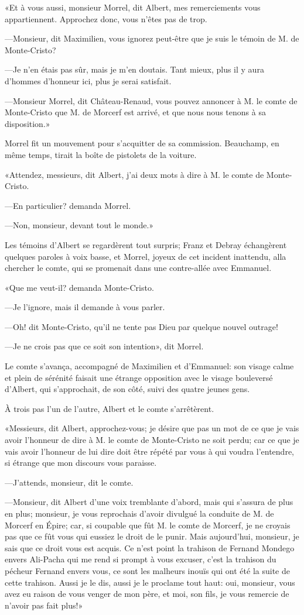 «Et à vous aussi, monsieur Morrel, dit Albert, mes remerciements vous appartiennent. Approchez donc, vous n'êtes pas de trop. 

—Monsieur, dit Maximilien, vous ignorez peut-être que je suis le témoin de M. de Monte-Cristo? 

—Je n'en étais pas sûr, mais je m'en doutais. Tant mieux, plus il y aura d'hommes d'honneur ici, plus je serai satisfait. 

—Monsieur Morrel, dit Château-Renaud, vous pouvez annoncer à M. le comte de Monte-Cristo que M. de Morcerf est arrivé, et que nous nous tenons à sa disposition.» 

Morrel fit un mouvement pour s'acquitter de sa commission. Beauchamp, en même temps, tirait la boîte de pistolets de la voiture. 

«Attendez, messieurs, dit Albert, j'ai deux mots à dire à M. le comte de Monte-Cristo. 

—En particulier? demanda Morrel. 

—Non, monsieur, devant tout le monde.» 

Les témoins d'Albert se regardèrent tout surpris; Franz et Debray échangèrent quelques paroles à voix basse, et Morrel, joyeux de cet incident inattendu, alla chercher le comte, qui se promenait dans une contre-allée avec Emmanuel. 

«Que me veut-il? demanda Monte-Cristo. 

—Je l'ignore, mais il demande à vous parler. 

—Oh! dit Monte-Cristo, qu'il ne tente pas Dieu par quelque nouvel outrage! 

—Je ne crois pas que ce soit son intention», dit Morrel. 

Le comte s'avança, accompagné de Maximilien et d'Emmanuel: son visage calme et plein de sérénité faisait une étrange opposition avec le visage bouleversé d'Albert, qui s'approchait, de son côté, suivi des quatre jeunes gens. 

À trois pas l'un de l'autre, Albert et le comte s'arrêtèrent. 

«Messieurs, dit Albert, approchez-vous; je désire que pas un mot de ce que je vais avoir l'honneur de dire à M. le comte de Monte-Cristo ne soit perdu; car ce que je vais avoir l'honneur de lui dire doit être répété par vous à qui voudra l'entendre, si étrange que mon discours vous paraisse. 

—J'attends, monsieur, dit le comte. 

—Monsieur, dit Albert d'une voix tremblante d'abord, mais qui s'assura de plus en plus; monsieur, je vous reprochais d'avoir divulgué la conduite de M. de Morcerf en Épire; car, si coupable que fût M. le comte de Morcerf, je ne croyais pas que ce fût vous qui eussiez le droit de le punir. Mais aujourd'hui, monsieur, je sais que ce droit vous est acquis. Ce n'est point la trahison de Fernand Mondego envers Ali-Pacha qui me rend si prompt à vous excuser, c'est la trahison du pécheur Fernand envers vous, ce sont les malheurs inouïs qui ont été la suite de cette trahison. Aussi je le dis, aussi je le proclame tout haut: oui, monsieur, vous avez eu raison de vous venger de mon père, et moi, son fils, je vous remercie de n'avoir pas fait plus!» 

